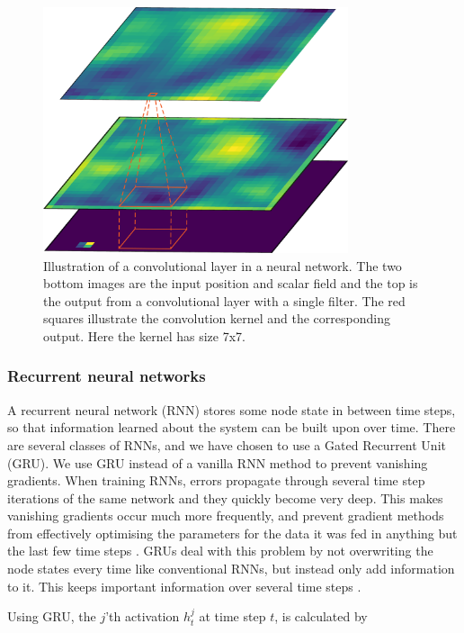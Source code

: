 \documentclass[a4paper]{article}
\begin{document}
\begin{figure}
    \centering
    \includegraphics[width=0.8\textwidth]{Figures/Conv_model.png}
    \caption{Illustration of a convolutional layer in a neural network. The two bottom images are the input position and scalar field and the top is the output from a convolutional layer with a single filter. The red squares illustrate the convolution kernel and the corresponding output. Here the kernel has size 7x7.}
    \label{fig:convolution}
\end{figure}

\subsubsection{Recurrent neural networks}

A recurrent neural network (RNN) stores some node state in between time steps, so that information learned about the system can be built upon over time. There are several classes of RNNs, and we have chosen to use a Gated Recurrent Unit (GRU). We use GRU instead of a vanilla RNN method to prevent vanishing gradients. When training RNNs, errors propagate through several time step iterations of the same network and they quickly become very deep. This makes vanishing gradients occur much more frequently, and prevent gradient methods from effectively optimising the parameters for the data it was fed in anything but the last few time steps \cite{gru_vs_lstm}. GRUs deal with this problem by not overwriting the node states every time like conventional RNNs, but instead only add information to it. This keeps important information over several time steps \cite{gru_vs_lstm}.

Using GRU, the $j$'th activation $h_t^j$ at time step $t$, is calculated by
\end{document}
